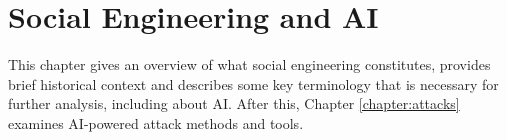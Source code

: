 

    

\chapter{Social Engineering and AI\label{chapter:definition}}
\begin{comment}

Guides:
    - Page limit 1-2 pages
    - Context and terminology (käsitteet), challenges and measurement criteria, values, research question analysis
    - Second to last paragraph contains the research question (RQ) and the results

TODO:
    [ ] Who is this thesis for
    [ ] Why should you read my thesis
    [ ] What is the research question and how it is answered
    [ ] How is this thesis organized, what is covered and what is deliberaly not covered and in what chapters (outline)

What to cover:
    - What is cybersecurity and why it's of paramount importance
    - What is social engineering
        - Brief history of social engineering
            - Phishing in 1996 via AOL
    - Attacks, classical social engineering attacks
        - Phishing, vishing, smishing
        - Tailgating
        - Baiting (not always considered SE)
        - Dumpster diving (not always considered SE)
    - Countermeasures, classical
        - User awareness & training programs
        - Company policy & company culture
        - Real-time threat detection
        - Vulnerability detection
    - Typical challenges
    - Motives for cybercrimes
        - Hard(er) to detect?
        - "Easy" wins?

Literature:
    - Defining Social Engineering in Cybersecurity

\end{comment}


This chapter gives an overview of what social engineering constitutes, provides brief historical context and describes some key terminology that is necessary for further analysis, including about AI. After this, Chapter \ref{chapter:attacks}  examines AI-powered attack methods and tools.


